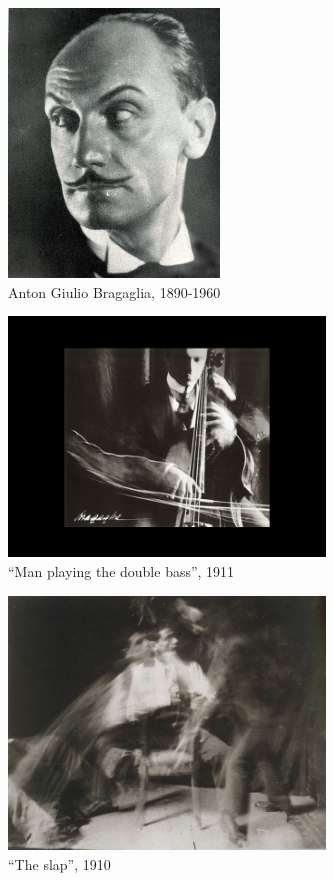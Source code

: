 \documentclass[
]{book}
\begin{document}
\begin{figure}
\centering
\includegraphics[width=0.5\textwidth,height=\textheight]{medias/corpus/bragaglia/Bragaglia_a_giulio.jpg}
\caption{Anton Giulio Bragaglia, 1890-1960}
\end{figure}

\begin{figure}
\centering
\includegraphics[width=0.75\textwidth,height=\textheight]{medias/corpus/bragaglia/Anton-Giulio-Bragaglia-fotodinamica-02.jpg}
\caption{``Man playing the double bass'', 1911}
\end{figure}

\begin{figure}
\centering
\includegraphics[width=0.75\textwidth,height=\textheight]{medias/corpus/bragaglia/Anton-Giulio-Bragaglia-fotodinamica-04.jpg}
\caption{``The slap'', 1910}
\end{figure}
\end{document}
